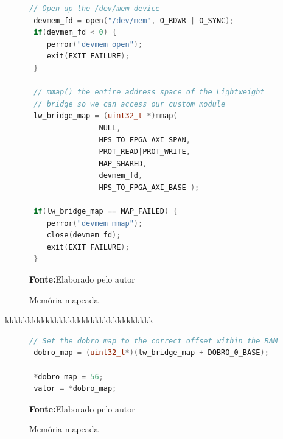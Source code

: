\begin{figure}[ht]
\caption{Memória mapeada}
\begin{center}
\begin{lstlisting}[language=C++, backgroundcolor=\color{gray!10}]
 // Open up the /dev/mem device
 devmem_fd = open("/dev/mem", O_RDWR | O_SYNC);
 if(devmem_fd < 0) {
	perror("devmem open"); 
	exit(EXIT_FAILURE);
 }	

 // mmap() the entire address space of the Lightweight 
 // bridge so we can access our custom module 
 lw_bridge_map = (uint32_t *)mmap( 
				NULL, 
				HPS_TO_FPGA_AXI_SPAN, 
				PROT_READ|PROT_WRITE, 
				MAP_SHARED, 
				devmem_fd, 
				HPS_TO_FPGA_AXI_BASE ); 
				
 if(lw_bridge_map == MAP_FAILED) {
	perror("devmem mmap");
	close(devmem_fd);
	exit(EXIT_FAILURE);
 }
\end{lstlisting}
{\small \textbf{Fonte:}Elaborado pelo autor}	
\end{center}\label{fig:codigomap}
\end{figure} 

kkkkkkkkkkkkkkkkkkkkkkkkkkkkkkkkk

\begin{figure}[ht]
\caption{Memória mapeada}
\begin{center}
\begin{lstlisting}[language=C++, backgroundcolor=\color{gray!10}]
 // Set the dobro_map to the correct offset within the RAM
 dobro_map = (uint32_t*)(lw_bridge_map + DOBRO_0_BASE);

 *dobro_map = 56;
 valor = *dobro_map;
\end{lstlisting}
{\small \textbf{Fonte:}Elaborado pelo autor}	
\end{center}\label{fig:codigomapdobro}
	
\end{figure}